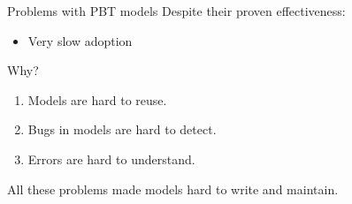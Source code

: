 \documentclass[aspectratio=169, 10pt]{beamer}
\begin{document}
\begin{frame}[label={sec:org103c5ee}]{Problems with PBT models}
\onslide<+->
\onslide<+->
Despite their proven effectiveness:
\begin{itemize}
\item Very slow adoption
\end{itemize}

\vspace{10pt}
\onslide<+->
Why?

\vspace{10pt}

\begin{enumerate}
\item Models are hard to reuse.
\item Bugs in models are hard to detect.
\item Errors are hard to understand.
\end{enumerate}
\onslide<+->
\vspace{10pt}

All these problems made models hard to write and maintain.
\end{frame}
\end{document}
